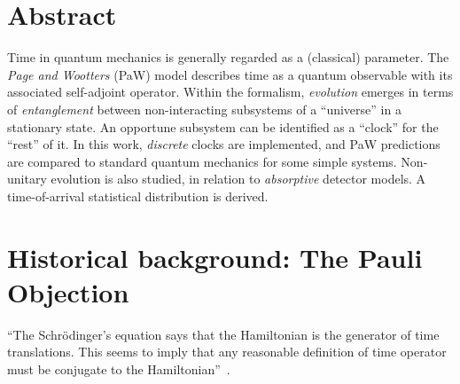\documentclass[a0,portrait]{a0poster}
\begin{document}
\begin{multicols}{2} %


\color{Navy} %

\section*{Abstract}
{Time} in quantum mechanics is generally regarded as a (classical) parameter.
%
The \emph{Page and Wootters} (PaW) model
describes time as a quantum observable with its associated self-adjoint operator.
%
Within the formalism, \emph{evolution} {emerges} in terms of \emph{entanglement} between non-interacting subsystems
of a “universe” in a stationary state.
%
An opportune subsystem can be identified as a “clock” for the “rest”
of it.
%
In this work, \emph{discrete} clocks are implemented,
and PaW predictions are compared to
standard quantum mechanics for some simple systems.
%
Non-unitary evolution is also studied, in relation to \emph{absorptive} detector models.
A time-of-arrival statistical distribution is derived.

\setlength{\parindent}{2em} %


\color{SaddleBrown} %


\section*{Historical background: The Pauli Objection}

%
``The Schr\"odinger's equation says that the Hamiltonian is the generator of time translations. This seems
to imply that any reasonable definition of time operator must be conjugate to the Hamiltonian''~\cite{Maccone:Pauli}.


\end{multicols}
\end{document}
